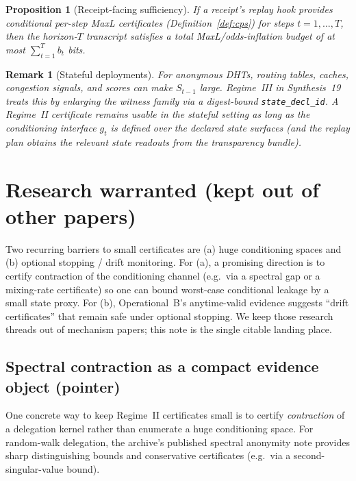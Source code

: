 \documentclass[11pt]{article}
\newtheorem{proposition}{Proposition}
\newtheorem{remark}{Remark}
\begin{document}
\begin{proposition}[Receipt-facing sufficiency]\label{prop:suff}
If a receipt's replay hook provides conditional per-step MaxL certificates (Definition~\ref{def:cps}) for steps $t=1,\dots,T$,
then the horizon-$T$ transcript satisfies a total MaxL/odds-inflation budget of at most $\sum_{t=1}^T b_t$ bits.
\end{proposition}

\begin{remark}[Stateful deployments]
For anonymous DHTs, routing tables, caches, congestion signals, and scores can make $S_{t-1}$ large.
Regime~III in Synthesis~19 treats this by enlarging the witness family via a digest-bound \texttt{state\_decl\_id}.\cite{series:accountingrulebook,series:planstateequiv}
A Regime~II certificate remains usable in the stateful setting as long as the conditioning interface $g_t$ is defined over the declared state surfaces
(and the replay plan obtains the relevant state readouts from the transparency bundle).
\end{remark}

\section{Research warranted (kept out of other papers)}
Two recurring barriers to small certificates are (a) huge conditioning spaces and (b) optional stopping / drift monitoring.
For (a), a promising direction is to certify contraction of the conditioning channel (e.g.\ via a spectral gap or a mixing-rate certificate)
so one can bound worst-case conditional leakage by a small state proxy.\cite{series:spectral}
For (b), Operational~B's anytime-valid evidence suggests ``drift certificates'' that remain safe under optional stopping.\cite{series:operationalB}
We keep those research threads out of mechanism papers; this note is the single citable landing place.

\subsection{Spectral contraction as a compact evidence object (pointer)}
\label{sec:spectral-cert}

One concrete way to keep Regime~II certificates small is to certify \emph{contraction} of a delegation kernel rather than enumerate a huge conditioning space.
For random-walk delegation, the archive's published spectral anonymity note provides sharp distinguishing bounds and conservative certificates (e.g.\ via a second-singular-value bound).\cite{series:spectral}
\end{document}
